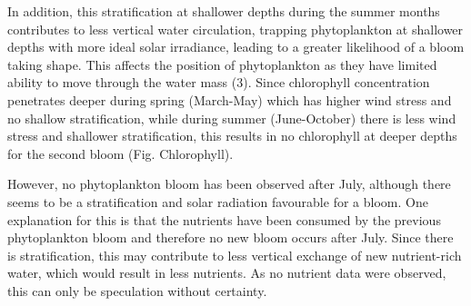 \documentclass[../Main.tex]{subfiles}
\begin{document}
In addition, this stratification at shallower depths during the summer months contributes to less vertical water circulation, trapping phytoplankton at shallower depths with more ideal solar irradiance, leading to a greater likelihood of a bloom taking shape. This affects the position of phytoplankton as they have limited ability to move through the water mass (3). Since chlorophyll concentration penetrates deeper during spring (March-May) which has higher wind stress and no shallow stratification, while during summer (June-October) there is less wind stress and shallower stratification, this results in no chlorophyll at deeper depths for the second bloom (Fig. Chlorophyll).

However, no phytoplankton bloom has been observed after July, although there seems to be a stratification and solar radiation favourable for a bloom. One explanation for this is that the nutrients have been consumed by the previous phytoplankton bloom and therefore no new bloom occurs after July. Since there is stratification, this may contribute to less vertical exchange of new nutrient-rich water, which would result in less nutrients. As no nutrient data were observed, this can only be speculation without certainty. 






 
\end{document}
